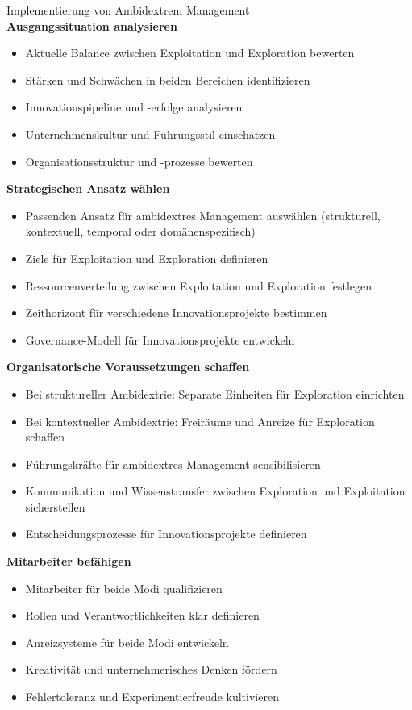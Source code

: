 \begin{KR}{Implementierung von Ambidextrem Management}\\
\textbf{Ausgangssituation analysieren}
\begin{itemize}
    \item Aktuelle Balance zwischen Exploitation und Exploration bewerten
    \item Stärken und Schwächen in beiden Bereichen identifizieren
    \item Innovationspipeline und -erfolge analysieren
    \item Unternehmenskultur und Führungsstil einschätzen
    \item Organisationsstruktur und -prozesse bewerten
\end{itemize}

\textbf{Strategischen Ansatz wählen}
\begin{itemize}
    \item Passenden Ansatz für ambidextres Management auswählen (strukturell, kontextuell, temporal oder domänenspezifisch)
    \item Ziele für Exploitation und Exploration definieren
    \item Ressourcenverteilung zwischen Exploitation und Exploration festlegen
    \item Zeithorizont für verschiedene Innovationsprojekte bestimmen
    \item Governance-Modell für Innovationsprojekte entwickeln
\end{itemize}

\textbf{Organisatorische Voraussetzungen schaffen}
\begin{itemize}
    \item Bei struktureller Ambidextrie: Separate Einheiten für Exploration einrichten
    \item Bei kontextueller Ambidextrie: Freiräume und Anreize für Exploration schaffen
    \item Führungskräfte für ambidextres Management sensibilisieren
    \item Kommunikation und Wissenstransfer zwischen Exploration und Exploitation sicherstellen
    \item Entscheidungsprozesse für Innovationsprojekte definieren
\end{itemize}

\textbf{Mitarbeiter befähigen}
\begin{itemize}
    \item Mitarbeiter für beide Modi qualifizieren
    \item Rollen und Verantwortlichkeiten klar definieren
    \item Anreizsysteme für beide Modi entwickeln
    \item Kreativität und unternehmerisches Denken fördern
    \item Fehlertoleranz und Experimentierfreude kultivieren
\end{itemize}


\end{KR}
